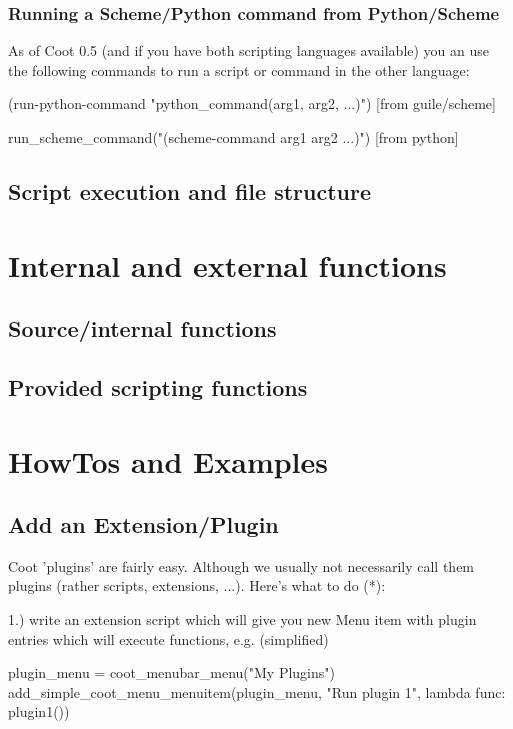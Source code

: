 \documentclass{article}
\begin{document}
\subsubsection{Running a Scheme/Python command from Python/Scheme}

As of Coot 0.5 (and if you have both scripting languages available) you an use the following commands to run a script or command in the other language:
\begin{code}
 (run-python-command "python_command(arg1, arg2, ...)")    [from guile/scheme]

 run_scheme_command("(scheme-command arg1 arg2 ...)")      [from python]
\end{code}


\subsection{Script execution and file structure}

\section{Internal and external functions}
\subsection{Source/internal functions}
\subsection{Provided scripting functions}

\section{HowTos and Examples}

\subsection{Add an Extension/Plugin}
Coot 'plugins' are fairly easy. Although we usually not necessarily call 
them plugins (rather scripts, extensions, ...). Here's what to do (*):

1.) write an extension script which will give you new Menu item with 
plugin entries which will execute functions, e.g. (simplified)

\begin{python}
plugin_menu = coot_menubar_menu("My Plugins")
add_simple_coot_menu_menuitem(plugin_menu, "Run plugin 1",
                                lambda func: plugin1())
\end{python}
\end{document}
